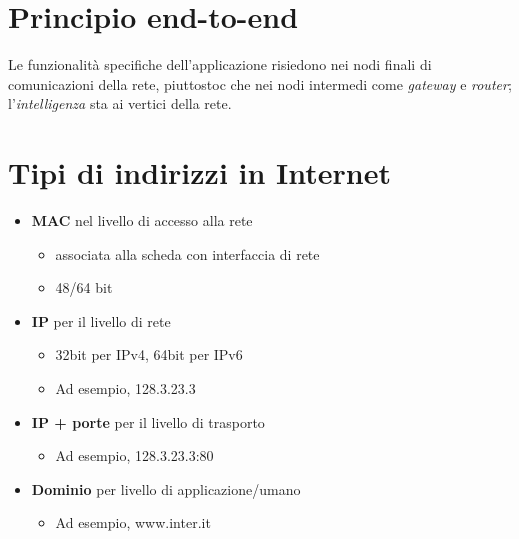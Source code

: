 \section{Principio end-to-end}
Le funzionalità specifiche dell'applicazione risiedono nei nodi finali di comunicazioni della rete, 
piuttostoc che nei nodi intermedi come \textit{gateway} e \textit{router}; l'\textit{intelligenza}
sta ai vertici della rete.

\section{Tipi di indirizzi in Internet}

\begin{itemize}
    \item \textbf{MAC} nel livello di accesso alla rete 
    \begin{itemize}
        \item associata alla scheda con interfaccia di rete 
        \item 48/64 bit 
    \end{itemize}
    \item \textbf{IP} per il livello di rete 
    \begin{itemize}
        \item 32bit per IPv4, 64bit per IPv6
        \item Ad esempio, 128.3.23.3
    \end{itemize}
    \item \textbf{IP + porte} per il livello di trasporto
    \begin{itemize}
        \item Ad esempio, 128.3.23.3:80
    \end{itemize}
    \item \textbf{Dominio} per livello di applicazione/umano 
    \begin{itemize}
        \item Ad esempio, www.inter.it 
    \end{itemize}
\end{itemize}

